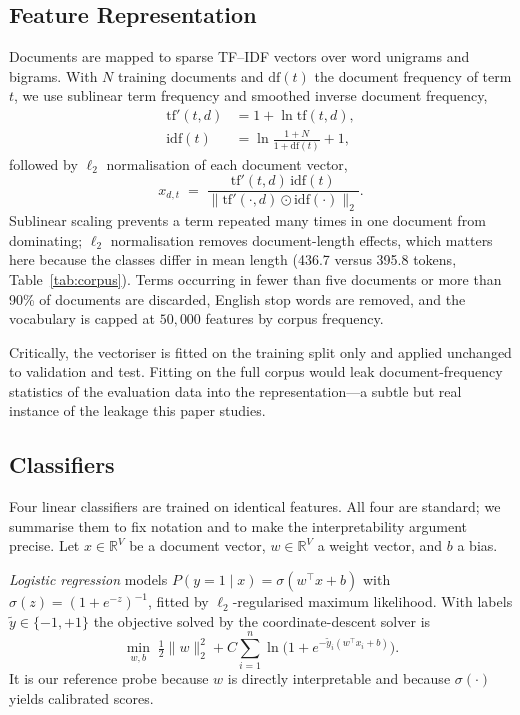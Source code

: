 \documentclass[conference]{IEEEtran}
\begin{document}
\subsection{Feature Representation}
Documents are mapped to sparse TF--IDF vectors
\cite{sparckjones1972statistical,salton1988term} over word unigrams and
bigrams. With $N$ training documents and $\mathrm{df}(t)$ the document
frequency of term $t$, we use sublinear term frequency and smoothed inverse
document frequency,
\begin{align}
  \mathrm{tf}'(t,d) &= 1 + \ln \mathrm{tf}(t,d), \label{eq:tf}\\
  \mathrm{idf}(t)   &= \ln\!\frac{1+N}{1+\mathrm{df}(t)} + 1,
  \label{eq:idf}
\end{align}
followed by $\ell_2$ normalisation of each document vector,
\begin{equation}
  x_{d,t} \;=\;
  \frac{\mathrm{tf}'(t,d)\,\mathrm{idf}(t)}
       {\big\lVert \mathrm{tf}'(\cdot,d)\odot\mathrm{idf}(\cdot)\big\rVert_2}.
  \label{eq:tfidf}
\end{equation}
Sublinear scaling prevents a term repeated many times in one document from
dominating; $\ell_2$ normalisation removes document-length effects, which
matters here because the classes differ in mean length (436.7 versus 395.8
tokens, Table~\ref{tab:corpus}). Terms occurring in fewer than five documents
or more than 90\% of documents are discarded, English stop words are removed,
and the vocabulary is capped at $50{,}000$ features by corpus frequency.

Critically, the vectoriser is fitted on the training split only and applied
unchanged to validation and test. Fitting on the full corpus would leak
document-frequency statistics of the evaluation data into the representation---a
subtle but real instance of the leakage this paper studies.

\subsection{Classifiers}
Four linear classifiers are trained on identical features. All four are
standard; we summarise them to fix notation and to make the interpretability
argument precise. Let $x\in\mathbb{R}^{V}$ be a document vector,
$w\in\mathbb{R}^{V}$ a weight vector, and $b$ a bias.

\emph{Logistic regression} models
$P(y{=}1\mid x)=\sigma(w^{\!\top}x+b)$ with
$\sigma(z)=(1+e^{-z})^{-1}$, fitted by $\ell_2$-regularised maximum likelihood.
With labels $\tilde{y}\in\{-1,+1\}$ the objective solved by the coordinate-descent
solver \cite{fan2008liblinear} is
\begin{equation}
  \min_{w,b}\;\tfrac{1}{2}\lVert w\rVert_2^2
  + C\sum_{i=1}^{n}\ln\!\big(1+e^{-\tilde{y}_i(w^{\!\top}x_i+b)}\big).
  \label{eq:lr}
\end{equation}
It is our reference probe because $w$ is directly interpretable and because
$\sigma(\cdot)$ yields calibrated scores.
\end{document}
